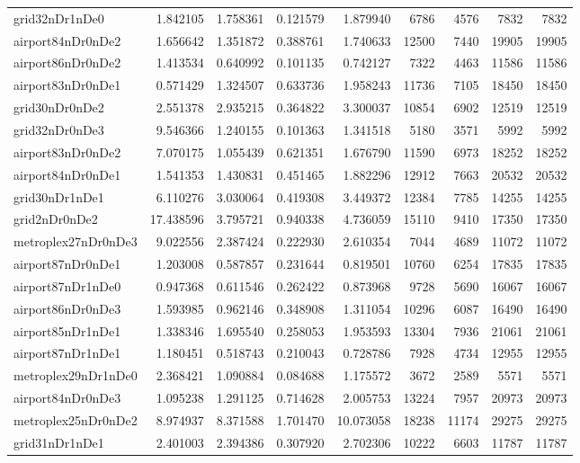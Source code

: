 \begin{longtable}{|l|r|r|r|r|r|r|r|r|}
grid32nDr1nDe0 & 1.842105 & 1.758361 & 0.121579 & 1.879940 & 6786 & 4576 & 7832 & 7832 \\
airport84nDr0nDe2 & 1.656642 & 1.351872 & 0.388761 & 1.740633 & 12500 & 7440 & 19905 & 19905 \\
airport86nDr0nDe2 & 1.413534 & 0.640992 & 0.101135 & 0.742127 & 7322 & 4463 & 11586 & 11586 \\
airport83nDr0nDe1 & 0.571429 & 1.324507 & 0.633736 & 1.958243 & 11736 & 7105 & 18450 & 18450 \\
grid30nDr0nDe2 & 2.551378 & 2.935215 & 0.364822 & 3.300037 & 10854 & 6902 & 12519 & 12519 \\
grid32nDr0nDe3 & 9.546366 & 1.240155 & 0.101363 & 1.341518 & 5180 & 3571 & 5992 & 5992 \\
airport83nDr0nDe2 & 7.070175 & 1.055439 & 0.621351 & 1.676790 & 11590 & 6973 & 18252 & 18252 \\
airport84nDr0nDe1 & 1.541353 & 1.430831 & 0.451465 & 1.882296 & 12912 & 7663 & 20532 & 20532 \\
grid30nDr1nDe1 & 6.110276 & 3.030064 & 0.419308 & 3.449372 & 12384 & 7785 & 14255 & 14255 \\
grid2nDr0nDe2 & 17.438596 & 3.795721 & 0.940338 & 4.736059 & 15110 & 9410 & 17350 & 17350 \\
metroplex27nDr0nDe3 & 9.022556 & 2.387424 & 0.222930 & 2.610354 & 7044 & 4689 & 11072 & 11072 \\
airport87nDr0nDe1 & 1.203008 & 0.587857 & 0.231644 & 0.819501 & 10760 & 6254 & 17835 & 17835 \\
airport87nDr1nDe0 & 0.947368 & 0.611546 & 0.262422 & 0.873968 & 9728 & 5690 & 16067 & 16067 \\
airport86nDr0nDe3 & 1.593985 & 0.962146 & 0.348908 & 1.311054 & 10296 & 6087 & 16490 & 16490 \\
airport85nDr1nDe1 & 1.338346 & 1.695540 & 0.258053 & 1.953593 & 13304 & 7936 & 21061 & 21061 \\
airport87nDr1nDe1 & 1.180451 & 0.518743 & 0.210043 & 0.728786 & 7928 & 4734 & 12955 & 12955 \\
metroplex29nDr1nDe0 & 2.368421 & 1.090884 & 0.084688 & 1.175572 & 3672 & 2589 & 5571 & 5571 \\
airport84nDr0nDe3 & 1.095238 & 1.291125 & 0.714628 & 2.005753 & 13224 & 7957 & 20973 & 20973 \\
metroplex25nDr0nDe2 & 8.974937 & 8.371588 & 1.701470 & 10.073058 & 18238 & 11174 & 29275 & 29275 \\
grid31nDr1nDe1 & 2.401003 & 2.394386 & 0.307920 & 2.702306 & 10222 & 6603 & 11787 & 11787 \\

\end{longtable}
